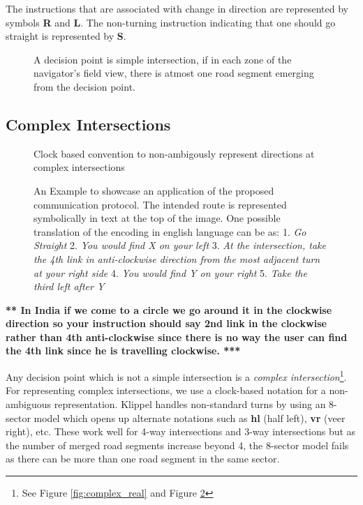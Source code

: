 \documentclass{iitkthesis}
\begin{document}
The instructions that are associated with change in direction are 
represented by symbols \textbf{R} and \textbf{L}. The non-turning 
instruction indicating that one should go straight is represented by {\bf S}. 

\begin{figure}
\centering
\caption{A decision point is simple intersection, if in each zone of the 
navigator's field view, there is atmost one road segment emerging from 
the decision point.}
\label{fig:simpleturns}
 \end{figure}
\subsection{Complex Intersections}
\begin{figure}
\centering
\caption{Clock based convention to non-ambigously represent directions at complex intersections}
\label{fig:complex}
 \end{figure}
\begin{figure}
\centering
\caption{An Example to showcase an application of the proposed 
communication protocol. The intended route is represented symbolically in 
text at the top of the image. One possible translation of the encoding in 
english language can be as: 
1. \textit{Go Straight}
2. \textit{You would find X on your left}
3. \textit{At the intersection, take the 4th link in anti-clockwise direction from the most adjacent turn at your right side} 
4. \textit{You would find Y on your right}
5. \textit{Take the third left after Y}
}
\label{fig:complexex}
 \end{figure} 

{\bf *** In India if we come to a circle we go around it in the clockwise
direction so your instruction should say 2nd link in the clockwise rather
than 4th anti-clockwise since there is no way the user can find the 4th
link since he is travelling clockwise. ***}

Any decision point which is not a simple intersection is a 
\textit{complex intersection}\footnote{See Figure \ref{fig:complex_real} 
and Figure \ref{fig:complex}}. For representing complex intersections, we 
use a clock-based notation for a non-ambiguous representation. Klippel 
\cite{klippel} handles non-standard turns by using an 8-sector model which 
opens up alternate notations such as \textbf{hl} (half left), 
\textbf{vr} (veer right), etc. These work well for 4-way intersections 
and 3-way intersections but as the number of merged road segments 
increase beyond 4, the 8-sector model fails as there can be more than one 
road segment in the same sector.
\end{document}
